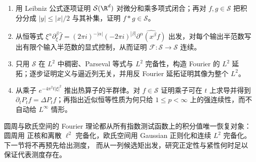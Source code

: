 \begin{exercise}
\begin{enumerate}
  \item 用 Leibniz 公式逐项证明 $\mathcal S(\R^d)$ 对微分和乘多项式闭合；再对
        $f,g\in\mathcal S$ 把积分分成 $|y|\le |x|/2$ 与其补集，证明 $f*g\in\mathcal S$。
  \item 从恒等式
        $\xi^\alpha\partial_\xi^\beta\widehat f
        =(2\pi i)^{-|\alpha|}(-2\pi i)^{|\beta|}
        \widehat{\partial^\alpha(x^\beta f)}$
        出发，对每个输出半范数写出有限个输入半范数的显式控制，从而证明
        $\mathcal F:\mathcal S\to\mathcal S$ 连续。
  \item 只用 $\mathcal S$ 在 $L^2$ 中稠密、Parseval 等式与 $L^2$ 完备性，构造 Fourier 的
        $L^2$ 延拓；逐步证明定义与逼近列无关，并用反 Fourier 延拓证明其像为整个 $L^2$。
  \item 从乘子 $e^{-4\pi^2t|\xi|^2}$ 推出热算子的半群律。对 $f\in\mathcal S$ 证明乘子可在
        $t$ 上求导并得到 $\partial_tP_tf=\Delta P_tf$；再指出近似恒等性质为何只给
        $1\le p<\infty$ 上的强连续性，而不自动给 $L^\infty$ 情形。
\end{enumerate}
\end{exercise}

圆周与欧氏空间的 Fourier 理论都从所有指数测试函数上的积分值唯一恢复对象：圆周用 \Fejer{} 正核和离散
$\ell^2$ 完备化，欧氏空间用 Gaussian 正则化和连续 $L^2$ 完备化。下一节将不再预先给出测度，
而从一列候选矩出发，研究正定性与紧性何时足以保证代表测度存在。
